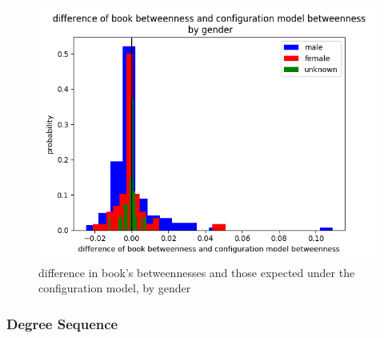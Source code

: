 \begin{figure}[ht!]
    \centering
    \includegraphics[width=.4 \textwidth]{images/gender_betweenness_by_gender.png}
    \caption{difference in book's betweennesses and those expected under the configuration model, by gender}
    \label{difference-in-betweenness}
\end{figure}

\subsubsection{Degree Sequence}
 

